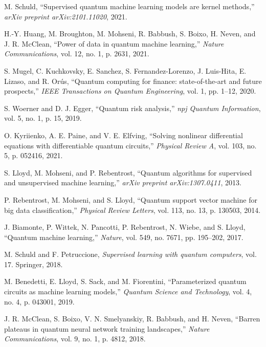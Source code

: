 \documentclass[11pt]{article}
\begin{document}
\begin{thebibliography}{50}
M. Schuld, ``Supervised quantum machine learning models are kernel methods,'' \textit{arXiv preprint arXiv:2101.11020}, 2021.

H.-Y. Huang, M. Broughton, M. Mohseni, R. Babbush, S. Boixo, H. Neven, and J. R. McClean, ``Power of data in quantum machine learning,'' \textit{Nature Communications}, vol. 12, no. 1, p. 2631, 2021.

S. Mugel, C. Kuchkovsky, E. Sanchez, S. Fernandez-Lorenzo, J. Luis-Hita, E. Lizaso, and R. Orús, ``Quantum computing for finance: state-of-the-art and future prospects,'' \textit{IEEE Transactions on Quantum Engineering}, vol. 1, pp. 1--12, 2020.

S. Woerner and D. J. Egger, ``Quantum risk analysis,'' \textit{npj Quantum Information}, vol. 5, no. 1, p. 15, 2019.

O. Kyriienko, A. E. Paine, and V. E. Elfving, ``Solving nonlinear differential equations with differentiable quantum circuits,'' \textit{Physical Review A}, vol. 103, no. 5, p. 052416, 2021.

S. Lloyd, M. Mohseni, and P. Rebentrost, ``Quantum algorithms for supervised and unsupervised machine learning,'' \textit{arXiv preprint arXiv:1307.0411}, 2013.

P. Rebentrost, M. Mohseni, and S. Lloyd, ``Quantum support vector machine for big data classification,'' \textit{Physical Review Letters}, vol. 113, no. 13, p. 130503, 2014.

J. Biamonte, P. Wittek, N. Pancotti, P. Rebentrost, N. Wiebe, and S. Lloyd, ``Quantum machine learning,'' \textit{Nature}, vol. 549, no. 7671, pp. 195--202, 2017.

M. Schuld and F. Petruccione, \textit{Supervised learning with quantum computers}, vol. 17. Springer, 2018.

M. Benedetti, E. Lloyd, S. Sack, and M. Fiorentini, ``Parameterized quantum circuits as machine learning models,'' \textit{Quantum Science and Technology}, vol. 4, no. 4, p. 043001, 2019.

J. R. McClean, S. Boixo, V. N. Smelyanskiy, R. Babbush, and H. Neven, ``Barren plateaus in quantum neural network training landscapes,'' \textit{Nature Communications}, vol. 9, no. 1, p. 4812, 2018.


\end{thebibliography}
\end{document}
